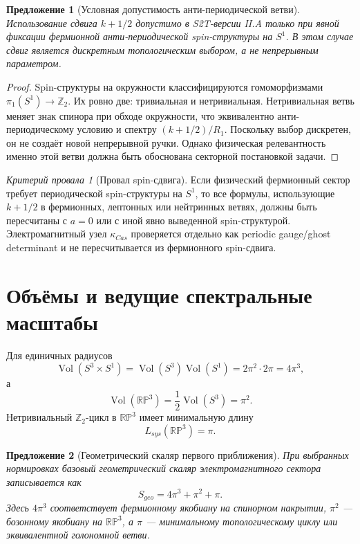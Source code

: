 \documentclass[12pt,a4paper]{report}
\newtheorem{proposition}{Предложение}[chapter]
\theoremstyle{remark}
\newtheorem{nogocriterion}{Критерий провала}[chapter]
\DeclareMathOperator{\Vol}{Vol}
\begin{document}
\begin{proposition}[Условная допустимость анти-периодической ветви]
Использование сдвига \(k+1/2\) допустимо в S2T-версии II.A только при явной фиксации фермионной анти-периодической spin-структуры на \(S^1\). В этом случае сдвиг является дискретным топологическим выбором, а не непрерывным параметром.
\end{proposition}

\begin{proof}
Spin-структуры на окружности классифицируются гомоморфизмами \(\pi_1(S^1)\to\mathbb{Z}_2\). Их ровно две: тривиальная и нетривиальная. Нетривиальная ветвь меняет знак спинора при обходе окружности, что эквивалентно анти-периодическому условию и спектру \((k+1/2)/R_1\). Поскольку выбор дискретен, он не создаёт новой непрерывной ручки. Однако физическая релевантность именно этой ветви должна быть обоснована секторной постановкой задачи.
\end{proof}

\begin{nogocriterion}[Провал spin-сдвига]
Если физический фермионный сектор требует периодической spin-структуры на \(S^1\), то все формулы, использующие \(k+1/2\) в фермионных, лептонных или нейтринных ветвях, должны быть пересчитаны с \(a=0\) или с иной явно выведенной spin-структурой. Электромагнитный узел \(\kappa_{Cas}\) проверяется отдельно как periodic gauge/ghost determinant и не пересчитывается из фермионного spin-сдвига.
\end{nogocriterion}

\section{Объёмы и ведущие спектральные масштабы}

Для единичных радиусов
\begin{equation}
    \Vol(S^3\times S^1)=\Vol(S^3)\Vol(S^1)=2\pi^2\cdot 2\pi=4\pi^3,
\end{equation}
а
\begin{equation}
    \Vol(\mathbb{RP}^3)=\frac{1}{2}\Vol(S^3)=\pi^2.
\end{equation}
Нетривиальный \(\mathbb{Z}_2\)-цикл в \(\mathbb{RP}^3\) имеет минимальную длину
\begin{equation}
    L_{sys}(\mathbb{RP}^3)=\pi.
\end{equation}

\begin{proposition}[Геометрический скаляр первого приближения]
При выбранных нормировках базовый геометрический скаляр электромагнитного сектора записывается как
\begin{equation}
    S_{geo}=4\pi^3+\pi^2+\pi.
\end{equation}
Здесь \(4\pi^3\) соответствует фермионному якобиану на спинорном накрытии, \(\pi^2\) --- бозонному якобиану на \(\mathbb{RP}^3\), а \(\pi\) --- минимальному топологическому циклу или эквивалентной голономной ветви.
\end{proposition}
\end{document}
